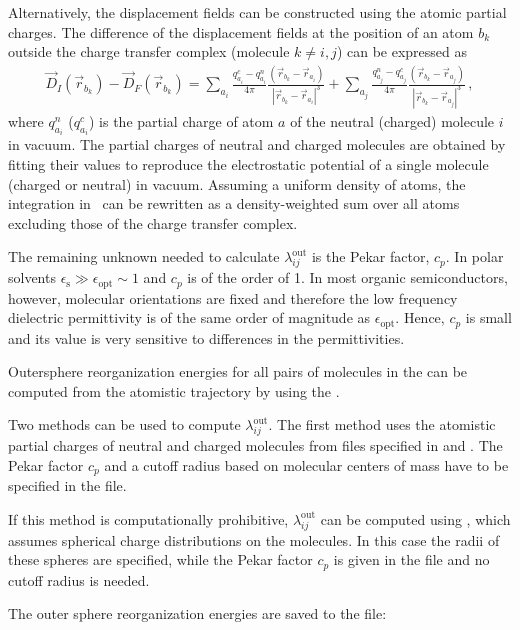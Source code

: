 Alternatively, the displacement fields can be constructed using the atomic 
partial charges. The difference of the displacement fields at the position of an 
atom $b_k$ outside the charge transfer complex (molecule $k \ne i,j$)  can be 
expressed as
\begin{eqnarray}
\label{equ:disp_atom}
\vec{D}_I(\vec{r}_{b_k}) - \vec{D}_F(\vec{r}_{b_k})  = 
\sum_{a_i} \frac{q_{a_i}^c - q_{a_i}^n}{4\pi } \frac{ (\vec{r}_{b_k} - 
\vec{r}_{a_i} ) }
                                            {|\vec{r}_{b_k}-\vec{r}_{a_i}|^3}+
\sum_{a_j} \frac{q_{a_j}^n - q_{a_j}^c}{4\pi } \frac{ 
(\vec{r}_{b_k}-\vec{r}_{a_j} ) } 
                                            {|\vec{r}_{b_k}-\vec{r}_{a_j}|^3}\,,
\end{eqnarray}
where $q^n_{a_i}$ ($q^c_{a_i}$) is the partial charge of atom $a$ of the neutral 
(charged) molecule $i$ in vacuum. The partial charges of neutral and charged 
molecules are obtained by fitting their values to reproduce the electrostatic 
potential of a single molecule (charged or neutral) in vacuum. 
%
Assuming a uniform density of atoms, the integration in~ can 
be rewritten as a density-weighted sum over all atoms excluding those of the 
charge transfer complex.

The remaining unknown needed to calculate $\lambda_{ij}^\text{out}$ is the Pekar 
factor, $c_p$. In polar solvents 
$\epsilon_\text{s}\gg\epsilon_\text{opt}\sim 1$ and $c_p$ is of the order of 1. 
In most organic semiconductors, however, molecular orientations are fixed and 
therefore the low frequency dielectric permittivity is of the same order of 
magnitude as $\epsilon_\text{opt}$. Hence, $c_p$ is small and its value is very 
sensitive to differences in the permittivities. 


Outersphere reorganization energies for all pairs of molecules in the 
 can be computed from the atomistic 
trajectory by using the  \calculator. 

Two methods can be used to compute $\lambda_{ij}^\text{out}$. The first method 
uses the atomistic partial charges of neutral and charged molecules from files 
specified in \xmlmap and . The Pekar factor $c_p$ and a 
cutoff radius  based on molecular centers of mass have to be specified in the 
\xmloptions file. 

If this method is computationally prohibitive, $\lambda_{ij}^\text{out}$ can be 
computed using , which assumes spherical charge distributions 
on the molecules. In this case the radii of these spheres are specified, while the Pekar factor $c_p$ is given in the \xmloptions file and 
no cutoff radius is needed. 

The outer sphere reorganization energies are saved to the \sqlstate file:
